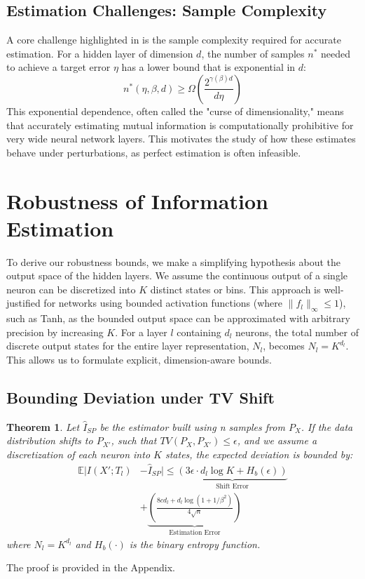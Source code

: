 \documentclass[conference]{IEEEtran}
\newtheorem{theorem}{Theorem}
\begin{document}
\subsection{Estimation Challenges: Sample Complexity}
A core challenge highlighted in \cite{goldfeld2019estimating} is the sample complexity required for accurate estimation. For a hidden layer of dimension $d$, the number of samples $n^*$ needed to achieve a target error $\eta$ has a lower bound that is exponential in $d$:
\begin{equation}
n^*(\eta, \beta, d) \ge \Omega \left( \frac{2^{\gamma(\beta)d}}{d\eta} \right)
\end{equation}
This exponential dependence, often called the "curse of dimensionality," means that accurately estimating mutual information is computationally prohibitive for very wide neural network layers. This motivates the study of how these estimates behave under perturbations, as perfect estimation is often infeasible.

\section{Robustness of Information Estimation}

To derive our robustness bounds, we make a simplifying hypothesis about the output space of the hidden layers. We assume the continuous output of a single neuron can be discretized into $K$ distinct states or bins. This approach is well-justified for networks using bounded activation functions (where $\|f_l\|_{\infty} \le 1$), such as Tanh, as the bounded output space can be approximated with arbitrary precision by increasing $K$. For a layer $l$ containing $d_l$ neurons, the total number of discrete output states for the entire layer representation, $N_l$, becomes $N_l = K^{d_l}$. This allows us to formulate explicit, dimension-aware bounds.

\subsection{Bounding Deviation under TV Shift}
\begin{theorem}
Let $\hat{I}_{SP}$ be the estimator built using n samples from $P_X$. If the data distribution shifts to $P_{X'}$, such that $TV(P_X, P_{X'}) \le \epsilon$, and we assume a discretization of each neuron into $K$ states, the expected deviation is bounded by:
\begin{equation}
\begin{split}
\mathbb{E}|I(X'; T_l) &- \hat{I}_{SP}| \le \underbrace{(3\epsilon \cdot d_l \log K + H_b(\epsilon))}_{\text{Shift Error}} \\
& + \underbrace{\left(\frac{8cd_l + d_l \log(1+1/\beta^2)}{4\sqrt{n}}\right)}_{\text{Estimation Error}}
\end{split}
\end{equation}
where $N_l=K^{d_l}$ and $H_b(\cdot)$ is the binary entropy function.
\end{theorem}
The proof is provided in the Appendix.
\end{document}
